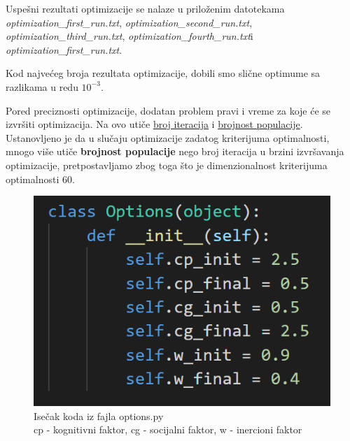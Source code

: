 \documentclass[12pt, a4paper]{article}
\begin{document}
    Uspešni rezultati optimizacije se nalaze u priloženim datotekama \textit{optimization\_first\_run.txt}, \textit{optimization\_second\_run.txt}, 
    \textit{optimization\_third\_run.txt}, \textit{optimization\_fourth\_run.txt}\space i 
    \textit{optimization\_first\_run.txt}.
    
    Kod najvećeg broja rezultata optimizacije, dobili smo slične optimume sa razlikama
    u redu $10^{-3}$.
    
    Pored preciznosti optimizacije, dodatan problem pravi i vreme za koje će se izvršiti
    optimizacija. Na ovo utiče \underline{broj iteracija} i \underline{brojnost populacije}. Ustanovljeno je da u slučaju optimizacije zadatog kriterijuma
    optimalnosti, mnogo više utiče \textbf{brojnost populacije} nego broj iteracija u brzini
    izvršavanja optimizacije, pretpostavljamo zbog toga što je dimenzionalnost kriterijuma
    optimalnosti 60.\\
    
    
    \vspace{20mm}
    
    \begin{figure}[h]
        \centering
        \includegraphics[scale=0.45]{Options_class.png}
        \caption{Isečak koda iz fajla options.py\\cp - kognitivni faktor, cg - socijalni faktor, w - inercioni faktor}
        \label{fig:code_snippet}
    \end{figure}
\end{document}

